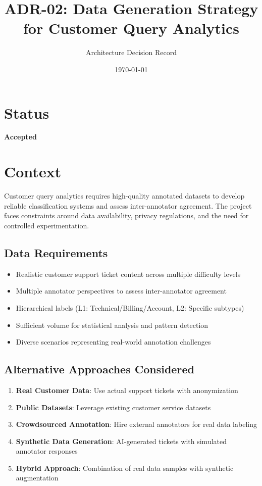 \documentclass[11pt]{article}
\title{\textbf{ADR-02: Data Generation Strategy for Customer Query Analytics}}
\author{Architecture Decision Record}
\date{\today}
\begin{document}
\maketitle

\section{Status}
\textbf{Accepted}

\section{Context}

Customer query analytics requires high-quality annotated datasets to develop reliable classification systems and assess inter-annotator agreement. The project faces constraints around data availability, privacy regulations, and the need for controlled experimentation.

\subsection{Data Requirements}
\begin{itemize}
\item Realistic customer support ticket content across multiple difficulty levels
\item Multiple annotator perspectives to assess inter-annotator agreement
\item Hierarchical labels (L1: Technical/Billing/Account, L2: Specific subtypes)
\item Sufficient volume for statistical analysis and pattern detection
\item Diverse scenarios representing real-world annotation challenges
\end{itemize}

\subsection{Alternative Approaches Considered}
\begin{enumerate}
\item \textbf{Real Customer Data}: Use actual support tickets with anonymization
\item \textbf{Public Datasets}: Leverage existing customer service datasets
\item \textbf{Crowdsourced Annotation}: Hire external annotators for real data labeling
\item \textbf{Synthetic Data Generation}: AI-generated tickets with simulated annotator responses
\item \textbf{Hybrid Approach}: Combination of real data samples with synthetic augmentation
\end{enumerate}
\end{document}
